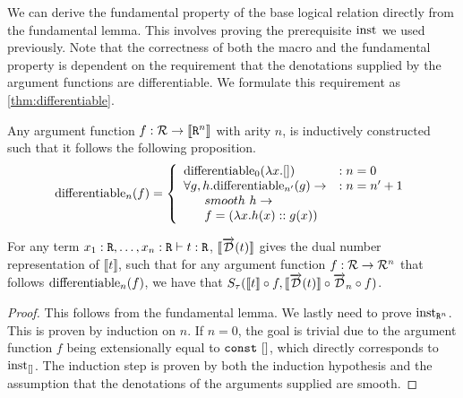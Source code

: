   We can derive the fundamental property of the base logical relation directly from the fundamental lemma.
  This involves proving the prerequisite $\text{inst}_{}$ we used previously.
  Note that the correctness of both the macro and the fundamental property is dependent on the requirement that the denotations supplied by the argument functions are differentiable.
  We formulate this requirement as \cref{thm:differentiable}.

  \begin{definition}\label{thm:differentiable}
    Any argument function $f : \mathcal{R} \rightarrow \llbracket \texttt{R}^n \rrbracket$ with arity $n$, is inductively constructed such that it follows the following proposition.
    \begin{equation}
      \text{differentiable}_{n}(f) =
        \left\{
          \begin{array}{ll}
            \text{differentiable}_{0}(\lambda x. [])
              & : n = 0 \\
            \forall g, h.
              \text{differentiable}_{n'}(g) \rightarrow
              & : n = n' + 1 \\
              \;\;\;\;\;\;smooth\ h \rightarrow \\
              \;\;\;\;\;\;f = (\lambda x. h(x) :: g(x))
          \end{array}
        \right.
    \label{eqn:differentiable_base}
    \end{equation}
  \end{definition}

  \begin{corollary}\label{thm:fundamental_property}
    For any term $x_1 : \texttt{R}, \dots, x_n : \texttt{R} \vdash t : \texttt{R}$, $\llbracket\overrightarrow{\mathcal{D}}(t)\rrbracket$ gives the dual number representation of $\llbracket t \rrbracket$, such that for any argument function $f : \mathcal{R} \to \mathcal{R}^n$ that follows $\text{differentiable}_{n}(f)$, we have that $S_\tau(\llbracket t\rrbracket \circ f, \llbracket \overrightarrow{\mathcal{D}}(t)\rrbracket \circ \overrightarrow{\mathcal{D}}_n \circ f)$.
  \end{corollary}

  \begin{proof}
    This follows from the fundamental lemma. We lastly need to prove $\text{inst}_{\texttt{R}^n}$.
    This is proven by induction on $n$.
    If $n = 0$, the goal is trivial due to the argument function $f$ being extensionally equal to $\texttt{const}\ []$, which directly corresponds to $\text{inst}_{[]}$.
    The induction step is proven by both the induction hypothesis and the assumption that the denotations of the arguments supplied are smooth.
  \end{proof}

